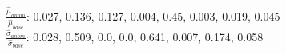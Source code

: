 $\frac{\hat\mu_{anom}}{\hat\mu_{base}}$: 0.027, 0.136, 0.127, 0.004, 0.45, 0.003, 0.019, 0.045\\$\frac{\hat\sigma_{anom}}{\hat\sigma_{base}}$: 0.028, 0.509, 0.0, 0.0, 0.641, 0.007, 0.174, 0.058